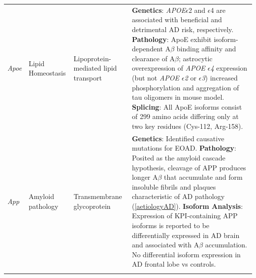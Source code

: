 \begin{landscape}
\begin{longtable}[c]{p{1cm}p{2cm}p{4cm}p{19cm}}
			\centering \textit{Apoe} &
			\centering Lipid Homeostasis  &
			\centering Lipoprotein-mediated lipid transport  &
			\tabitem \textbf{Genetics}: \textit{APOE}$\epsilon$2 and $\epsilon$4 are associated with beneficial and detrimental AD risk, respectively. \newline
			\tabitem \textbf{Pathology}: ApoE exhibit isoform-dependent A$\beta$ binding affinity and clearance of A$\beta$; astrocytic overexpression of \textit{APOE $\epsilon$4} expression (but not \textit{APOE $\epsilon$2} or \textit{$\epsilon$3}) increased phosphorylation and aggregation of tau oligomers in mouse model\cite{Jablonski2021}. \newline
			\tabitem \textbf{Splicing}: All ApoE isoforms consist of 299 amino acids differing only at two key residues (Cys-112, Arg-158). \\
			
			\centering \textit{App} &
			\centering Amyloid pathology  &
			\centering Transmembrane glycoprotein  &
			\tabitem \textbf{Genetics}: Identified causative mutations for EOAD. \newline
			\tabitem \textbf{Pathology}: Posited as the amyloid cascade hypothesis, cleavage of APP produces longer A$\beta$ that accumulate and form insoluble fibrils and plaques characteristic of AD pathology (\cref{aetiologyAD}).\newline
			\tabitem \textbf{Isoform Analysis}: Expression of KPI-containing APP isoforms is reported to be differentially expressed in AD brain and associated with A$\beta$ accumulation\cite{Zhang2011}. No differential isoform expression in AD frontal lobe vs controls\cite{Panegyres2000}. \\
			\hdashline[0.5pt/5pt]
			

\end{longtable}
\end{landscape}
